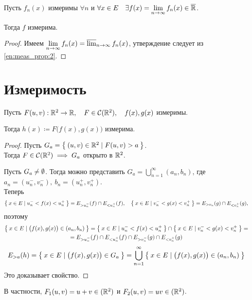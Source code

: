 \begin{property}
	Пусть $ f_n(x) $ измеримы $ \forall n $ и $ \forall x \in E \quad \exists f(x) = \lim\limits_{n \to \infty} f_n(x) \in \overline {\mathbb{R}} $.

	Тогда $ f $ измерима.
\end{property}

\begin{proof}
	Имеем $ \lim\limits_{n \to \infty} f_n(x) = \varlimsup_{n \to \infty} f_n(x) $, утверждение следует из \ref{en:meas_prop:2}.
\end{proof}

\section{Измеримость }

\begin{property}
	Пусть $ F(u, v) : \mathbb{R}^2 \to \mathbb{R}, \quad F \in \mathcal C(\mathbb{R}^2), \quad f(x), g(x) $ измеримы.

	Тогда $ h(x) \coloneq F \bigl( f(x), g(x) \bigr) $ измерима.
\end{property}

\begin{proof}

	Пусть $ G_a = \Set{(u, v) \in \ensuremath{\mathbb{R}}^2 \mid F(u, v) > a} $. \\
	Тогда $ F \in \mathcal C(\mathbb{R}^2) \implies G_a $ открыто в $ \mathbb{R}^2 $.

	Пусть $ G_a \ne \emptyset $. Тогда можно представить $ G_a = \bigcup_{n = 1}^\infty (a_n, b_n) $, где $ a_n = (u_n^-, v_n^-), ~ b_n = (u_n^+, v_n^+) $. \\
	Теперь
	$$ \Set{x \in E \mid u_n^- < f(x) < u_n^+} = E_{>u_n^-}(f) \cap E_{<u_n^+}(f), \quad \Set{x \in E \mid v_n^- < g(x) < v_n^+} = E_{>v_n}(g) \cap E_{<v_n^+}(g), $$
	поэтому
	\begin{multline*}
		\Set{x \in E \mid \bigl( f(x), g(x) \bigr) \in (a_n, b_n)} = \Set{x \in E \mid u_n^- < f(x) < u_n^+} \cap \Set{x \in E \mid v_n^- < g(x) < v_n^+} = \\
		= E_{>u_n^-}(f) \cap E_{<u_n^+}(f) \cap E_{>v_n^-}(g) \cap E_{<v_n^+}(g)
	\end{multline*}
	$$ E_{>a}(h) = \Set{x \in E \mid \bigl( f(x), g(x) \bigr) \in G_a} = \bigcup_{n = 1}^\infty \Set{x \in E \mid \bigl( f(x), g(x) \bigr) \in (a_n, b_n)} $$
	Это доказывает свойство.
\end{proof}

В частности, $ F_1(u, v) = u + v \in \mathcal(\mathbb{R}^2) $ и $ F_2(u, v) = uv \in \mathcal(\mathbb{R}^2) $.


